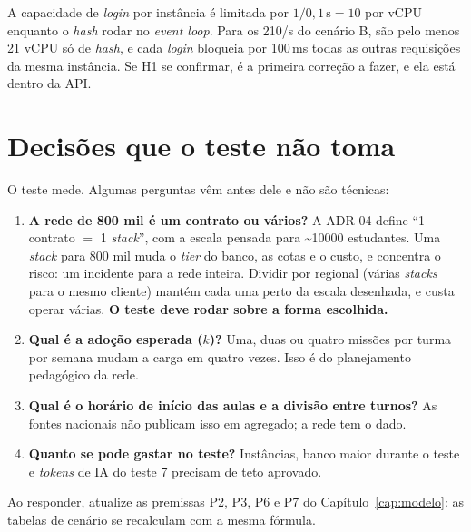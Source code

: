 \documentclass[11pt, a4paper, oneside, openany]{report}
\begin{document}
A capacidade de \emph{login} por instância é limitada por
$1 / 0{,}1\,\text{s} = 10$ por vCPU enquanto o \emph{hash} rodar no
\emph{event loop}. Para os 210/s do cenário B, são pelo menos 21 vCPU só de
\emph{hash}, e cada \emph{login} bloqueia por 100\,ms todas as outras
requisições da mesma instância. Se H1 se confirmar, é a primeira correção a
fazer, e ela está dentro da API.

\chapter{Decisões que o teste não toma}
\label{cap:decisoes}

O teste mede. Algumas perguntas vêm antes dele e não são técnicas:

\begin{enumerate}
  \item \textbf{A rede de 800 mil é um contrato ou vários?} A ADR-04 define
    \enquote{1 contrato $=$ 1 \emph{stack}}, com a escala pensada para
    \textasciitilde\num{10000} estudantes. Uma \emph{stack} para 800 mil muda o
    \emph{tier} do banco, as cotas e o custo, e concentra o risco: um incidente
    para a rede inteira. Dividir por regional (várias \emph{stacks} para o mesmo
    cliente) mantém cada uma perto da escala desenhada, e custa operar
    várias. \textbf{O teste deve rodar sobre a forma escolhida.}
  \item \textbf{Qual é a adoção esperada ($k$)?} Uma, duas ou quatro missões por
    turma por semana mudam a carga em quatro vezes. Isso é do planejamento
    pedagógico da rede.
  \item \textbf{Qual é o horário de início das aulas e a divisão entre
    turnos?} As fontes nacionais não publicam isso em agregado; a rede tem o
    dado.
  \item \textbf{Quanto se pode gastar no teste?} Instâncias, banco maior
    durante o teste e \emph{tokens} de IA do teste 7 precisam de teto aprovado.
\end{enumerate}

\begin{nota}
Ao responder, atualize as premissas P2, P3, P6 e P7 do
Capítulo~\ref{cap:modelo}: as tabelas de cenário se recalculam com a mesma
fórmula.
\end{nota}

\end{document}
